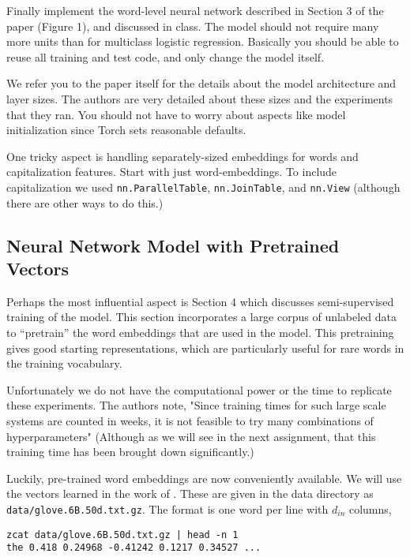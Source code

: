 \documentclass[11pt]{article}
\begin{document}
Finally implement the word-level neural network described in Section 3
of the paper (Figure 1), and discussed in class. The model should not
require many more units than for multiclass logistic
regression. Basically you should be able to reuse all training and
test code, and only change the model itself.

We refer you to the paper itself for the details about the model
architecture and layer sizes. The authors are very detailed about
these sizes and the experiments that they ran. You should not have to
worry about aspects like model initialization since Torch sets
reasonable defaults.

One tricky aspect is handling separately-sized embeddings for words
and capitalization features. Start with just word-embeddings.  To
include capitalization we used \texttt{nn.ParallelTable},
\texttt{nn.JoinTable}, and \texttt{nn.View} (although there are other
ways to do this.)


\subsection{Neural Network Model with Pretrained Vectors}

Perhaps the most influential aspect is Section 4 which discusses
semi-supervised training of the model. This section incorporates a
large corpus of unlabeled data to ``pretrain'' the word embeddings
that are used in the model. This pretraining gives good starting
representations, which are particularly useful for rare words in the 
training vocabulary.


Unfortunately we do not have the computational power or the time to
replicate these experiments. The authors note, "Since training times
for such large scale systems are counted in weeks, it is not feasible
to try many combinations of hyperparameters" (Although as we will see
in the next assignment, that this training time has been brought down
significantly.)
 
Luckily, pre-trained word embeddings are now conveniently
available. We will use the vectors learned in the work of
\citet{DBLP:conf/emnlp/PenningtonSM14}. These are given in the 
data directory as \texttt{data/glove.6B.50d.txt.gz}. The format 
is one word per line with $d_{in}$ columns,   

\begin{verbatim}
zcat data/glove.6B.50d.txt.gz | head -n 1
the 0.418 0.24968 -0.41242 0.1217 0.34527 ...
\end{verbatim}
\end{document}
